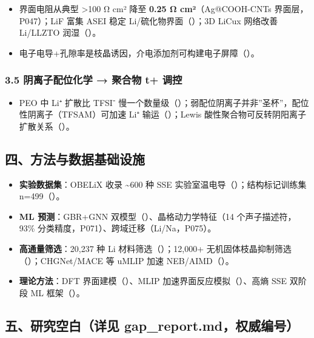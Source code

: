 \documentclass[12pt,a4paper]{ctexart}
\providecommand{\tightlist}{%
  \setlength{\itemsep}{0pt}\setlength{\parskip}{0pt}}
\begin{document}
\begin{itemize}
\tightlist
\item
  界面电阻从典型 \textgreater100 Ω cm² 降至 \textbf{0.25 Ω cm²}（Ag@COOH-CNTs 界面层，P047）；LiF 富集 ASEI 稳定 Li/硫化物界面（\cite{P017,P020}）；3D LiCux 网络改善 Li/LLZTO 润湿（\cite{P060}）。
\item
  电子电导+孔隙率是枝晶诱因，介电添加剂可构建电子屏障（\cite{P034}）。
\end{itemize}

\subsubsection{3.5 阴离子配位化学 → 聚合物 t+ 调控}\label{ux9634ux79bbux5b50ux914dux4f4dux5316ux5b66-ux805aux5408ux7269-t-ux8c03ux63a7}

\begin{itemize}
\tightlist
\item
  PEO 中 Li⁺ 扩散比 TFSI⁻ 慢一个数量级（\cite{P039}）；弱配位阴离子并非''圣杯''，配位性阴离子（TFSAM）可加速 Li⁺ 输运（\cite{P038}）；Lewis 酸性聚合物可反转阴阳离子扩散关系（\cite{P039}）。
\end{itemize}

\subsection{四、方法与数据基础设施}\label{ux56dbux65b9ux6cd5ux4e0eux6570ux636eux57faux7840ux8bbeux65bd}

\begin{itemize}
\tightlist
\item
  \textbf{实验数据集}：OBELiX 收录 \textasciitilde600 种 SSE 实验室温电导（\cite{P080}）；结构标记训练集 n=499（\cite{P068}）。
\item
  \textbf{ML 预测}：GBR+GNN 双模型（\cite{P068}）、晶格动力学特征（14 个声子描述符，93\% 分类精度，P071）、跨域迁移（Li/Na，P075）。
\item
  \textbf{高通量筛选}：20,237 种 Li 材料筛选（\cite{P079}）；12,000+ 无机固体枝晶抑制筛选（\cite{P077}）；CHGNet/MACE 等 uMLIP 加速 NEB/AIMD（\cite{P042,P074,P070}）。
\item
  \textbf{理论方法}：DFT 界面建模（\cite{P007,P058}）、MLIP 加速界面反应模拟（\cite{P045}）、高熵 SSE 双阶段 ML 框架（\cite{P073}）。
\end{itemize}

\subsection{五、研究空白（详见 gap\_report.md，权威编号）}\label{ux4e94ux7814ux7a76ux7a7aux767dux8be6ux89c1-gap_report.mdux6743ux5a01ux7f16ux53f7}
\end{document}
